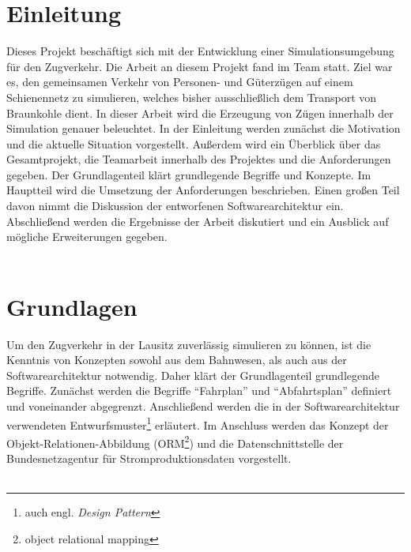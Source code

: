\documentclass{scrbook} %
\begin{document}
	\ifisbook\fi
	\ifisbook\cleardoubleemptypage\fi

	
	\ifisbook\cleardoubleemptypage\fi
	\tableofcontents
	\cleardoublepage


	\chapter{Einleitung}
	Dieses Projekt beschäftigt sich mit der Entwicklung einer Simulationsumgebung für den Zugverkehr. Die Arbeit an diesem Projekt fand im Team statt. Ziel war es, den gemeinsamen Verkehr von Personen- und Güterzügen auf einem Schienennetz zu simulieren, welches bisher ausschließlich dem Transport von Braunkohle dient. In dieser Arbeit wird die Erzeugung von Zügen innerhalb der Simulation genauer beleuchtet. In der Einleitung werden zunächst die Motivation und die aktuelle Situation vorgestellt. Außerdem wird ein Überblick über das Gesamtprojekt, die Teamarbeit innerhalb des Projektes und die Anforderungen gegeben. Der Grundlagenteil klärt grundlegende Begriffe und Konzepte. Im Hauptteil wird die Umsetzung der Anforderungen beschrieben. Einen großen Teil davon nimmt die Diskussion der entworfenen Softwarearchitektur ein. Abschließend werden die Ergebnisse der Arbeit diskutiert und ein Ausblick auf mögliche Erweiterungen gegeben.\\
	\\
	
	
	
	
	

	\chapter{Grundlagen}
	Um den Zugverkehr in der Lausitz zuverlässig simulieren zu können, ist die Kenntnis von Konzepten sowohl aus dem Bahnwesen, als auch aus der Softwarearchitektur notwendig. Daher klärt der Grundlagenteil grundlegende Begriffe. Zunächst werden die Begriffe \enquote{Fahrplan} und \enquote{Abfahrtsplan} definiert und voneinander abgegrenzt. Anschließend werden die in der Softwarearchitektur verwendeten Entwurfsmuster\footnote{auch engl. \emph{Design Pattern}} erläutert. Im Anschluss werden das Konzept der Objekt-Relationen-Abbildung (ORM\footnote{object relational mapping}) und die Datenschnittstelle der Bundesnetzagentur für Stromproduktionsdaten vorgestellt.\\
	\\
	
	
	
	
	
\end{document}
